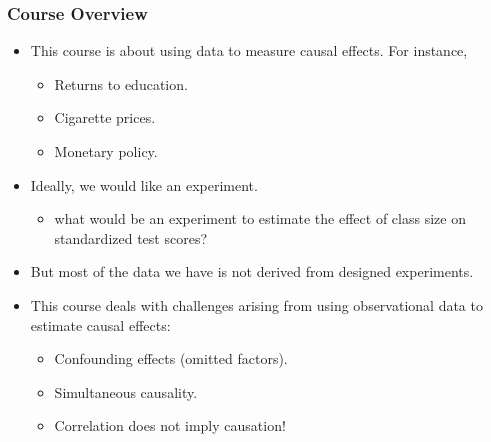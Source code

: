 \begin{frame}
\frametitle{Course Overview}
\begin{itemize}
\item This course is about using data to measure causal effects. For instance,
\begin{itemize}
\item Returns to education.
\item Cigarette prices.
\item Monetary policy.
\end{itemize}
\item Ideally, we would like an experiment.
\begin{itemize}  
\item what would be an experiment to estimate the effect of class size on standardized test scores?
\end{itemize}
\item But most of the data we have is not derived from designed experiments.
\item This course deals with challenges arising from using observational data to estimate causal effects:
\begin{itemize}  
\item Confounding effects (omitted factors).
\item Simultaneous causality.
\item Correlation does not imply causation!
\end{itemize}
\end{itemize}
\end{frame}

